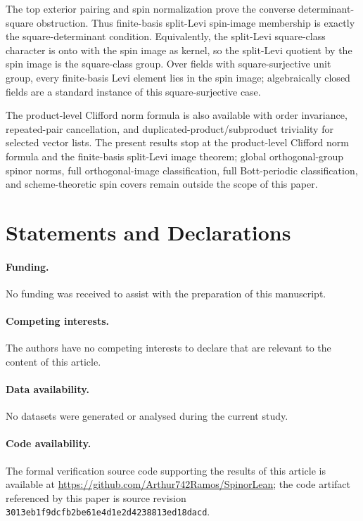 \documentclass{birkjour}
\theoremstyle{plain}
\theoremstyle{definition}
\theoremstyle{remark}
\begin{document}
The top exterior pairing and spin normalization prove the converse
determinant-square obstruction. Thus finite-basis split-Levi spin-image
membership is exactly the square-determinant condition. Equivalently, the
split-Levi square-class character is onto with the spin image as kernel, so the
split-Levi quotient by the spin image is the square-class group. Over fields
with square-surjective unit group, every finite-basis Levi element lies in the
spin image; algebraically closed fields are a standard instance of this
square-surjective case.

The product-level Clifford norm formula is also available with order
invariance, repeated-pair cancellation, and duplicated-product/subproduct
triviality for selected vector lists. The present results stop at the
product-level Clifford norm formula and the finite-basis split-Levi image
theorem; global orthogonal-group spinor norms, full orthogonal-image
classification, full Bott-periodic classification, and scheme-theoretic spin
covers remain outside the scope of this paper.

\section*{Statements and Declarations}

\paragraph{Funding.}
No funding was received to assist with the preparation of this manuscript.

\paragraph{Competing interests.}
The authors have no competing interests to declare that are relevant to the
content of this article.

\paragraph{Data availability.}
No datasets were generated or analysed during the current study.

\paragraph{Code availability.}
The formal verification source code supporting the results of this article is
available at \url{https://github.com/Arthur742Ramos/SpinorLean}; the code
artifact referenced by this paper is source revision
{\scriptsize\texttt{3013eb1f9dcfb2be61e4d1e2d4238813ed18dacd}}.

\begingroup
\raggedright


\endgroup
\end{document}
